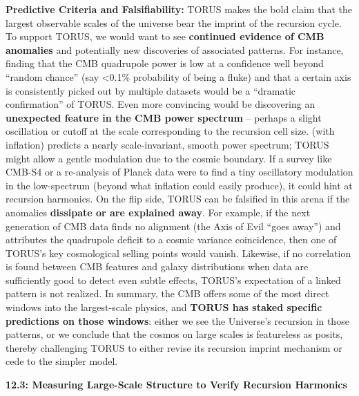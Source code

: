 \documentclass[
]{article}
\begin{document}
{\textbf{Predictive Criteria and Falsifiability:} TORUS makes the bold
claim that the largest observable scales of the universe bear the
imprint of the recursion cycle. To support TORUS, we would want to see
\textbf{continued evidence of CMB anomalies} and potentially new
discoveries of associated patterns. For instance, finding that the CMB
quadrupole power is low at a confidence well beyond ``random chance''
(say \textless0.1\% probability of being a fluke) and that a certain
axis is consistently picked out by multiple datasets would be a
``dramatic confirmation'' of TORUS\hspace{0pt}. Even more convincing
would be discovering an \textbf{unexpected feature in the CMB power
spectrum} -- perhaps a slight oscillation or cutoff at the scale
corresponding to the recursion cell size. \LambdaCDM (with inflation) predicts
a nearly scale-invariant, smooth power spectrum; TORUS might allow a
gentle modulation due to the cosmic boundary. If a survey like CMB-S4 or
a re-analysis of Planck data were to find a tiny oscillatory modulation
in the low-\ell spectrum (beyond what inflation could easily produce), it
could hint at recursion harmonics. On the flip side, TORUS can be
falsified in this arena if the anomalies \textbf{dissipate or are
explained away}. For example, if the next generation of CMB data finds
no alignment (the Axis of Evil ``goes away'') and attributes the
quadrupole deficit to a cosmic variance coincidence, then one of TORUS's
key cosmological selling points would vanish. Likewise, if no
correlation is found between CMB features and galaxy distributions when
data are sufficiently good to detect even subtle effects, TORUS's
expectation of a linked pattern is not realized. In summary, the CMB
offers some of the most direct windows into the largest-scale physics,
and \textbf{TORUS has staked specific predictions on those windows}:
either we see the Universe's recursion in those patterns, or we conclude
that the cosmos on large scales is featureless as \LambdaCDM posits, thereby
challenging TORUS to either revise its recursion imprint mechanism or
cede to the simpler model.

\textbf{12.3: Measuring Large-Scale Structure to Verify Recursion
Harmonics}

}
\end{document}

